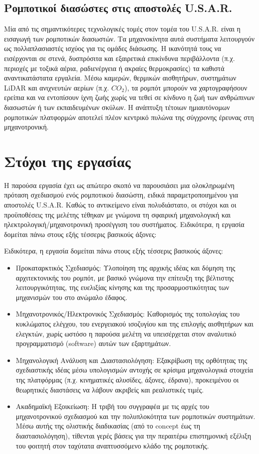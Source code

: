 \subsection{Ρομποτικοί διασώστες στις αποστολές U.S.A.R.}
Μία από τις σημαντικότερες τεχνολογικές τομές στον τομέα του U.S.A.R. είναι η εισαγωγή των ρομποτικών διασωστών. Τα μηχανοκίνητα αυτά συστήματα λειτουργούν ως πολλαπλασιαστές ισχύος για τις ομάδες διάσωσης. Η ικανότητά τους να εισέρχονται σε στενά, δυσπρόσιτα και εξαιρετικά επικίνδυνα περιβάλλοντα (π.χ. περιοχές με τοξικά αέρια, ραδιενέργεια ή ακραίες θερμοκρασίες) τα καθιστά αναντικατάστατα εργαλεία. Μέσω καμερών, θερμικών αισθητήρων, συστημάτων LiDAR και ανιχνευτών αερίων (π.χ. $CO_2$), τα ρομπότ μπορούν να χαρτογραφήσουν ερείπια και να εντοπίσουν ίχνη ζωής χωρίς να τεθεί σε κίνδυνο η ζωή των ανθρώπινων διασωστών ή των εκπαιδευμένων σκύλων. Η ανάπτυξη τέτοιων ημιαυτόνομων ρομποτικών πλατφορμών αποτελεί πλέον κεντρικό πυλώνα της σύγχρονης έρευνας στη μηχανοτρονική.

\section{Στόχοι της εργασίας}
Η παρούσα εργασία έχει ως απώτερο σκοπό να παρουσιάσει μια ολοκληρωμένη πρόταση σχεδιασμού ενός ρομποτικού διασώστη, ειδικά παραμετροποιημένου για αποστολές U.S.A.R. Καθώς το αντικείμενο είναι πολυδιάστατο, οι στόχοι και οι προϋποθέσεις της μελέτης τέθηκαν με γνώμονα τη σφαιρική μηχανολογική και ηλεκτρολογική/μηχανοτρονική προσέγγιση του συστήματος. Ειδικότερα, η εργασία δομείται πάνω στους εξής τέσσερις βασικούς άξονες:

\par Ειδικότερα, η εργασία δομείται πάνω στους εξής τέσσερις βασικούς άξονες:
\begin{itemize}
    \item Προκαταρκτικός Σχεδιασμός: Υλοποίηση της αρχικής ιδέας και δόμηση της αρχιτεκτονικής του ρομπότ, με βασικό γνώμονα την επίτευξη της βέλτιστης λειτουργικότητας, της ευελιξίας κίνησης και της προσαρμοστικότητας των μηχανισμών του στο ανώμαλο έδαφος.
    \item Μηχανοτρονικός/Ηλεκτρονικός Σχεδιασμός: Καθορισμός της τοπολογίας του κυκλώματος ελέγχου, του ενεργειακού ισοζυγίου και της επιλογής αισθητήρων και ελεγκτών, χωρίς ωστόσο η παρούσα μελέτη να υπεισέρχεται στον αναλυτικό προγραμματισμό (software) αυτών των εξαρτημάτων.
    \item Μηχανολογική Ανάλυση και Διαστασιολόγηση: Εξακρίβωση της ορθότητας της σχεδιαστικής ιδέας μέσω υπολογισμών αντοχής σε κρίσιμα μηχανολογικά στοιχεία της πλατφόρμας (π.χ. κινηματικές αλυσίδες, άξονες, έδρανα), προκειμένου οι θεωρητικές διαστάσεις να λάβουν ακριβείς και ρεαλιστικές τιμές.
    \item Ακαδημαϊκή Εξοικείωση: Η τριβή του συγγραφέα με τις αρχές του μηχανοτρονικού σχεδιασμού και την πολυπλοκότητα των ρομποτικών συστημάτων. Μέσω αυτής της ολιστικής διαδικασίας (από το concept έως τη διαστασιολόγηση), τίθενται γερές βάσεις για την περαιτέρω επιστημονική εξέλιξη του φοιτητή στον ταχύτατα αναπτυσσόμενο κλάδο της ρομποτικής.
\end{itemize}
